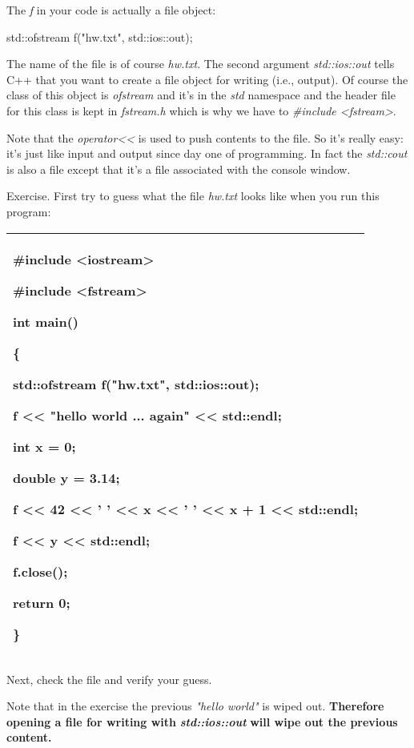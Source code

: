 \documentclass[
]{article}
\begin{document}
The \emph{f} in your code is actually a file object:

std::ofstream f("hw.txt", std::ios::out);

The name of the file is of course \emph{hw.txt}. The second argument
\emph{std::ios::out} tells C++ that you want to create a file object for
writing (i.e., output). Of course the class of this object is
\emph{ofstream} and it's in the \emph{std} namespace and the header file
for this class is kept in \emph{fstream.h} which is why we have to
\emph{\#include \textless fstream\textgreater{}}.

Note that the \emph{operator\textless\textless{}} is used to push
contents to the file. So it's really easy: it's just like input and
output since day one of programming. In fact the \emph{std::cout} is
also a file except that it's a file associated with the console window.

Exercise. First try to guess what the file \emph{hw.txt} looks like when
you run this program:

\begin{longtable}[]{@{}l@{}}
\toprule
\endhead
\begin{minipage}[t]{0.97\columnwidth}\raggedright
\#include \textless iostream\textgreater{}

\#include \textless fstream\textgreater{}

int main()

\{

std::ofstream f("hw.txt", std::ios::out);

f \textless\textless{} "hello world ... again" \textless\textless{}
std::endl;

int x = 0;

double y = 3.14;

f \textless\textless{} 42 \textless\textless{} ' ' \textless\textless{}
x \textless\textless{} ' ' \textless\textless{} x + 1
\textless\textless{} std::endl;

f \textless\textless{} y \textless\textless{} std::endl;

f.close();

return 0;

\}\strut
\end{minipage}\tabularnewline
\bottomrule
\end{longtable}

Next, check the file and verify your guess.

Note that in the exercise the previous \emph{"hello world"} is wiped
out. \textbf{Therefore opening a file for writing with
}\emph{\textbf{std::ios::out }}\textbf{will wipe out the previous
content.}
\end{document}
